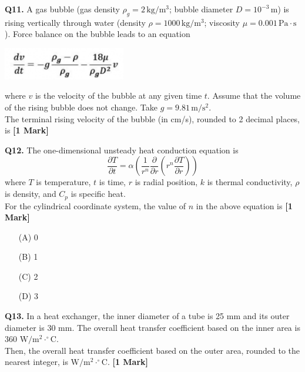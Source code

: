 \documentclass[11pt]{article}
\newcommand{\questiona}[2]{
    \noindent\textbf{Q#2.} #1 \hfill \textbf{[1 Mark]}
}
\begin{document}
\questiona{A gas bubble (gas density \( \rho_g = 2 \,\mathrm{kg/m^3} \); bubble diameter \( D = 10^{-3} \,\mathrm{m} \)) is rising vertically through water (density \( \rho = 1000 \,\mathrm{kg/m^3} \); viscosity \( \mu = 0.001 \,\mathrm{Pa{\cdot}s} \)). Force balance on the bubble leads to an equation 
\begin{center}
\includegraphics[width=0.4\textwidth]{figures/11.png}
\end{center}
where \( v \) is the velocity of the bubble at any given time \( t \). Assume that the volume of the rising bubble does not change. Take \( g = 9.81 \,\mathrm{m/s^2} \). \\ The terminal rising velocity of the bubble (in cm/s), rounded to 2 decimal places, is}{11}
\vspace{0.5cm}

\questiona{The one-dimensional unsteady heat conduction equation is  
\[
\frac{\partial T}{\partial t} = \alpha \left( \frac{1}{r^n} \frac{\partial}{\partial r} \left( r^n \frac{\partial T}{\partial r} \right) \right)
\]  
where \( T \) is temperature, \( t \) is time, \( r \) is radial position, \( k \) is thermal conductivity, \( \rho \) is density, and \( C_p \) is specific heat. \\  
For the cylindrical coordinate system, the value of \( n \) in the above equation is}{12}
\begin{enumerate}
    \item[(A)] 0  
    \item[(B)] 1  
    \item[(C)] 2  
    \item[(D)] 3  
\end{enumerate}
\vspace{0.5cm}

\questiona{In a heat exchanger, the inner diameter of a tube is 25 mm and its outer diameter is 30 mm. The overall heat transfer coefficient based on the inner area is 360 \( \mathrm{W/m^2{\cdot}^\circ C} \). \\  
Then, the overall heat transfer coefficient based on the outer area, rounded to the nearest integer, is \( \mathrm{W/m^2{\cdot}^\circ C} \).}{13}
\vspace{0.5cm}
\end{document}
